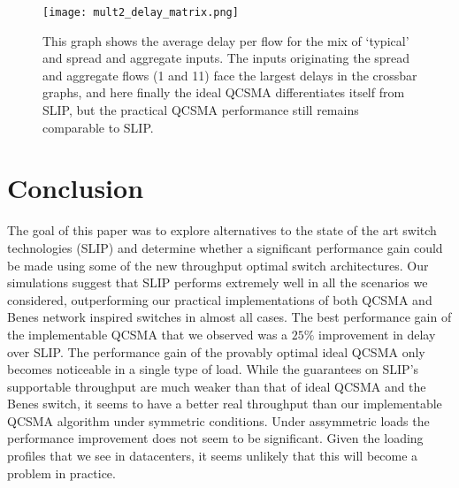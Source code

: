 \documentclass{IEEEtran}%
\begin{document}
\begin{figure}%
	 \texttt{[image: mult2\_delay\_matrix.png]}
	\caption{This graph shows the average delay per flow for the mix of `typical' and spread and aggregate inputs.  The inputs originating the spread and aggregate flows (1 and 11) face the largest delays in the crossbar graphs, and here finally the ideal QCSMA differentiates itself from SLIP, but the practical QCSMA performance still remains comparable to SLIP.}
	\label{mixed_delay_matrix}
\end{figure}
%
%
%

\section{Conclusion}
The goal of this paper was to explore alternatives to the state of the art switch technologies (SLIP) and determine whether a significant performance gain could be made using some of the new throughput optimal switch architectures.  Our simulations suggest that SLIP performs extremely well in all the scenarios we considered, outperforming our practical implementations of both QCSMA and Benes network inspired switches in almost all cases.    The best performance gain of the implementable QCSMA that we observed was a $25\%$ improvement in delay over SLIP.   The performance gain of the provably optimal ideal QCSMA only becomes noticeable in a single type of load.  While the guarantees on SLIP's supportable throughput are much weaker than that of ideal QCSMA and the Benes switch, it seems to have a better real throughput than our implementable QCSMA algorithm under symmetric conditions.  Under assymmetric loads the performance improvement does not seem to be significant.  Given the loading profiles that we see in datacenters, it seems unlikely that this will become a problem in practice.
\end{document}
